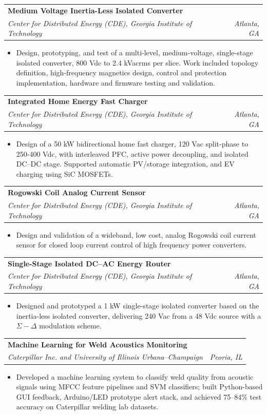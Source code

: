 \documentclass[letterpaper,11pt]{article}
\makeatletter
\newcommand{\resumeItem}[1]{
  \item\small{
    {#1 \vspace{-2pt}}
  }
}
\newcommand{\resumeSubheading}[4]{
  \vspace{-2pt}\item
    \begin{tabular*}{0.97\textwidth}[t]{l@{\extracolsep{\fill}}r}
      \textbf{#1} & #2 \\
      \textit{\small#3} & \textit{\small #4} \\
    \end{tabular*}\vspace{-7pt}
}
\newcommand{\resumeItemListStart}{\begin{itemize}}
\newcommand{\resumeItemListEnd}{\end{itemize}\vspace{-5pt}}
\makeatother
\begin{document}
\resumeSubheading
    {Medium Voltage Inertia-Less Isolated Converter}{}
    {Center for Distributed Energy (CDE), Georgia Institute of Technology}{Atlanta, GA}
    \resumeItemListStart
        \resumeItem{Design, prototyping, and test of a multi-level, medium-voltage, single-stage isolated converter, 800 Vdc to 2.4 kVacrms per slice. Work included topology definition, high-frequency magnetics design, control and protection implementation, hardware and firmware testing and validation.}
    \resumeItemListEnd
    
\newpage
\resumeSubheading
    {Integrated Home Energy Fast Charger} {}
    {Center for Distributed Energy (CDE), Georgia Institute of Technology}{Atlanta, GA}
    \resumeItemListStart
      \resumeItem{Design of a 50 kW bidirectional home fast charger, 120 Vac split-phase to 250-400 Vdc, with interleaved PFC, active power decoupling, and isolated DC–DC stage. Supported automatic PV/storage integration, and EV charging using SiC MOSFETs.}
    \resumeItemListEnd

\resumeSubheading
    {Rogowski Coil Analog Current Sensor} {}
    {Center for Distributed Energy (CDE), Georgia Institute of Technology}{Atlanta, GA}
    \resumeItemListStart
      \resumeItem{Design and validation of a wideband, low cost, analog Rogowski coil current sensor for closed loop current control of high frequency power converters. }
    \resumeItemListEnd

\resumeSubheading
    {Single-Stage Isolated DC–AC Energy Router} {}
    {Center for Distributed Energy (CDE), Georgia Institute of Technology}{Atlanta, GA}
    \resumeItemListStart
      \resumeItem{Designed and prototyped a 1 kW single-stage isolated converter based on the inertia-less isolated converter, delivering 240 Vac from a 48 Vdc source with a $\Sigma-\Delta$ modulation scheme.}
    \resumeItemListEnd
    

\resumeSubheading
  {Machine Learning for Weld Acoustics Monitoring}{}
  {Caterpillar Inc. and University of Illinois Urbana–Champaign}{Peoria, IL}
  \resumeItemListStart
    \resumeItem{Developed a machine learning system to classify weld quality from acoustic signals using MFCC feature pipelines and SVM classifiers; built Python-based GUI feedback, Arduino/LED prototype alert stack, and achieved 75–84\% test accuracy on Caterpillar welding lab datasets.}
  \resumeItemListEnd
\end{document}
